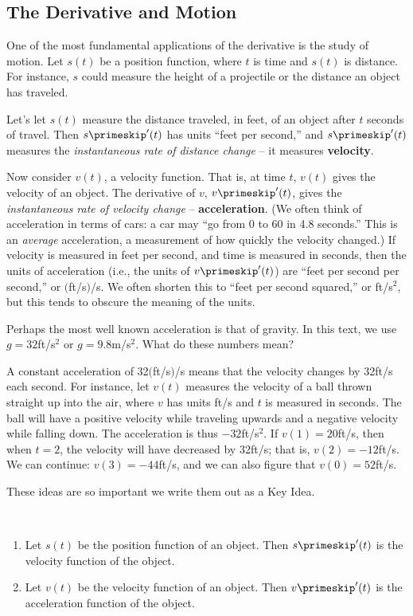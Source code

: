 \subsection{The Derivative and Motion}

One of the most fundamental applications of the derivative is the study of motion. Let $s(t)$ be a position function, where $t$ is time and $s(t)$ is  distance. For instance, $s$ could measure the height of a projectile or the distance an object has traveled. 

Let's let $s(t)$ measure the distance traveled, in feet, of an object after $t$ seconds of travel. Then $s\primeskip'(t)$ has units ``feet per second,'' and $s\primeskip'(t)$ measures the \textit{instantaneous rate of distance change} -- it measures \textbf{velocity}. 

Now consider $v(t)$, a velocity function. That is, at time $t$, $v(t)$ gives the velocity of an object. The derivative of $v$, $v\primeskip'(t)$, gives the \textit{instantaneous rate of velocity change} --
\textbf{acceleration}. (We often think of acceleration in terms of cars: a car may ``go from 0 to 60 in 4.8 seconds.'' This is an \textit{average} acceleration, a measurement of how quickly the velocity changed.) If velocity is measured in feet per second, and time is measured in seconds, then the units of acceleration (i.e., the units of $v\primeskip'(t)$) are ``feet per second per second,'' or $($ft/s$)$/s. We often shorten this to ``feet per second squared,'' or ft/s$^2$, but this tends to obscure the meaning of the units.

Perhaps the most well known acceleration is that of gravity. In this text, we use $g=32$ft/s$^2$ or $g=9.8$m/s$^2$. What do these numbers mean?

A constant acceleration of 32$($ft/s$)$/s means that the velocity changes by 32ft/s each second. For instance, let $v(t)$ measures the velocity of a ball thrown straight up into the air, where $v$ has units ft/s and $t$ is measured in seconds. The ball will have a positive velocity while traveling upwards and a negative velocity while falling down. The acceleration is thus $-32$ft/s$^2$. If $v(1) = 20$ft/s, then when $t=2$, the velocity will have decreased by 32ft/s; that is, $v(2) = -12$ft/s. We can continue: $v(3) = -44$ft/s, and we can also figure that $v(0) = 52$ft/s.

These ideas are so important we write them out as a Key Idea.

{~\\[-2\baselineskip]\begin{enumerate}
	\item Let $s(t)$ be the position function of an object. Then $s\primeskip'(t)$ is the velocity function of the object.
	\item	Let $v(t)$ be the velocity function of an object. Then $v\primeskip'(t)$ is the acceleration function of the object.
\end{enumerate}
}

